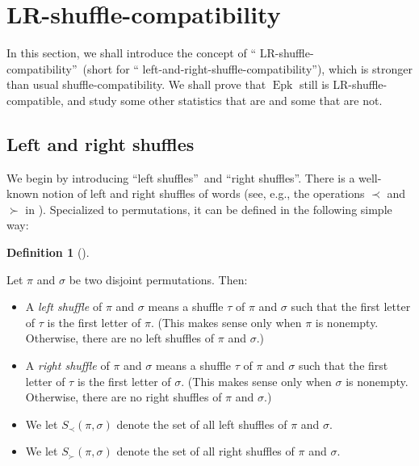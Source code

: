\documentclass[numbers=enddot,12pt,final,onecolumn,notitlepage]{scrartcl}%
\theoremstyle{definition}
\newtheorem{defi}[theo]{Definition}
\newenvironment{definition}[1][]
{\begin{defi}[#1]\begin{leftbar}}
{\end{leftbar}\end{defi}}
\begin{document}
\section{\label{sect.LR}LR-shuffle-compatibility}

In this section, we shall introduce the concept of \textquotedblleft
LR-shuffle-compatibility\textquotedblright\ (short for \textquotedblleft
left-and-right-shuffle-compatibility\textquotedblright), which is stronger
than usual shuffle-compatibility. We shall prove that $\operatorname*{Epk}$
still is LR-shuffle-compatible, and study some other statistics that are and
some that are not.

\subsection{Left and right shuffles}

We begin by introducing \textquotedblleft left shuffles\textquotedblright\ and
\textquotedblleft right shuffles\textquotedblright. There is a well-known
notion of left and right shuffles of words (see, e.g., the operations $\prec$
and $\succ$ in \cite[Example 1]{EbMaPa07}). Specialized to permutations, it
can be defined in the following simple way:

\begin{definition}
\label{def.LRshuf}Let $\pi$ and $\sigma$ be two disjoint permutations. Then:

\begin{itemize}
\item A \textit{left shuffle} of $\pi$ and $\sigma$ means a shuffle $\tau$ of
$\pi$ and $\sigma$ such that the first letter of $\tau$ is the first letter of
$\pi$. (This makes sense only when $\pi$ is nonempty. Otherwise, there are no
left shuffles of $\pi$ and $\sigma$.)

\item A \textit{right shuffle} of $\pi$ and $\sigma$ means a shuffle $\tau$ of
$\pi$ and $\sigma$ such that the first letter of $\tau$ is the first letter of
$\sigma$. (This makes sense only when $\sigma$ is nonempty. Otherwise, there
are no right shuffles of $\pi$ and $\sigma$.)

\item We let $S_{\prec}\left(  \pi,\sigma\right)  $ denote the set of all left
shuffles of $\pi$ and $\sigma$.

\item We let $S_{\succ}\left(  \pi,\sigma\right)  $ denote the set of all
right shuffles of $\pi$ and $\sigma$.
\end{itemize}
\end{definition}
\end{document}
